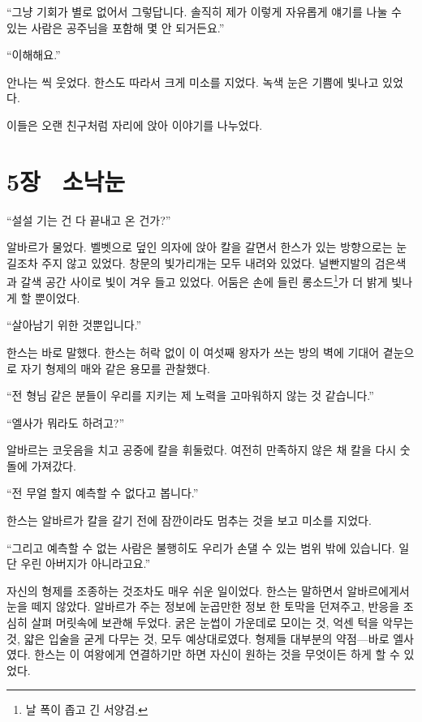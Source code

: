 ``그냥 기회가 별로 없어서 그렇답니다. 솔직히 제가 이렇게 자유롭게 얘기를 나눌 수 있는 사람은 공주님을 포함해 몇 안 되거든요.''

``이해해요.''

안나는 씩 웃었다. 한스도 따라서 크게 미소를 지었다. 녹색 눈은 기쁨에 빛나고 있었다.

이들은 오랜 친구처럼 자리에 앉아 이야기를 나누었다.



\chapter[5장  소낙눈][5장\hspace*{.5em}소낙눈]{5장 \ 소낙눈}



\forceindent``설설 기는 건 다 끝내고 온 건가?''

알바르가 물었다. 벨벳으로 덮인 의자에 앉아 칼을 갈면서 한스가 있는 방향으로는 눈길조차 주지 않고 있었다. 창문의 빛가리개는 모두 내려와 있었다. 널빤지발의 검은색과 갈색 공간 사이로 빛이 겨우 들고 있었다. 어둠은 손에 들린 롱소드\footnote{날 폭이 좁고 긴 서양검.}가 더 밝게 빛나게 할 뿐이었다.

``살아남기 위한 것뿐입니다.''

한스는 바로 말했다. 한스는 허락 없이 이 여섯째 왕자가 쓰는 방의 벽에 기대어 곁눈으로 자기 형제의 매와 같은 용모를 관찰했다.

``전 형님 같은 분들이 우리를 지키는 제 노력을 고마워하지 않는 것 같습니다.''

``엘사가 뭐라도 하려고?''

알바르는 코웃음을 치고 공중에 칼을 휘둘렀다. 여전히 만족하지 않은 채 칼을 다시 숫돌에 가져갔다.

``전 무얼 할지 예측할 수 없다고 봅니다.''

한스는 알바르가 칼을 갈기 전에 잠깐이라도 멈추는 것을 보고 미소를 지었다.

``그리고 예측할 수 없는 사람은 불행히도 우리가 손댈 수 있는 범위 밖에 있습니다. 일단 우린 아버지가 아니라고요.''

자신의 형제를 조종하는 것조차도 매우 쉬운 일이었다. 한스는 말하면서 알바르에게서 눈을 떼지 않았다. 알바르가 주는 정보에 눈곱만한 정보 한 토막을 던져주고, 반응을 조심히 살펴 머릿속에 보관해 두었다. 굵은 눈썹이 가운데로 모이는 것, 억센 턱을 악무는 것, 얇은 입술을 굳게 다무는 것, 모두 예상대로였다. 형제들 대부분의 약점—바로 엘사였다. 한스는 이 여왕에게 연결하기만 하면 자신이 원하는 것을 무엇이든 하게 할 수 있었다.

